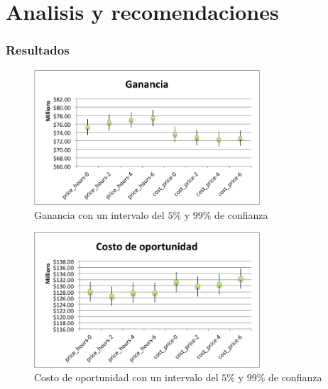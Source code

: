 \part*{Analisis y recomendaciones}

\section{Resultados}


\begin{figure}[H]

\begin{center}
    \includegraphics[width=0.75\textwidth,height=0.75\textheight,keepaspectratio]{./images/objective-earnings.png}
\end{center}

\label{fig:objective-earnings}
\caption{Ganancia con un intervalo del $5\%$ y $99\%$ de confianza}

\end{figure}

\begin{figure}[H]

\begin{center}
    \includegraphics[width=0.75\textwidth,height=0.75\textheight,keepaspectratio]{./images/objective-cost.png}
\end{center}

\label{fig:objective-cost}
\caption{Costo de oportunidad con un intervalo del $5\%$ y $99\%$ de confianza}

\end{figure}

